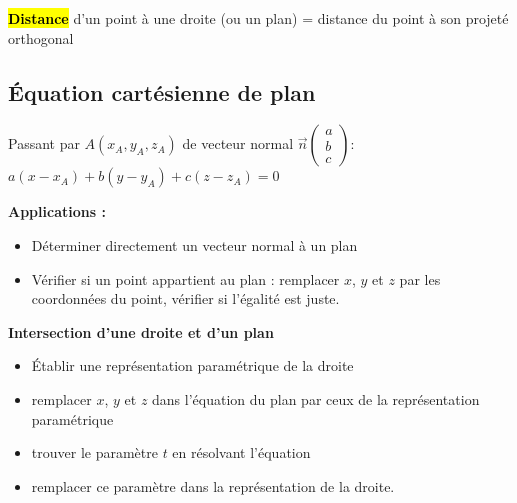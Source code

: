 \documentclass[10pt,fleqn, openany, landscape, twocolumn]{book} %
\begin{document}
\hfill {}


\hl{\textbf{Distance}} d'un point à une droite (ou un plan) = distance du point à son projeté orthogonal

\subsection*{Équation cartésienne de plan}
\vspace{-0.5cm}
Passant par $A(x_A, y_A, z_A)$ de vecteur normal $\vec n \begin{pmatrix}a\\b\\c\end{pmatrix}$: $a(x-x_A)+b(y-y_A)+c(z-z_A)=0$

\textbf{Applications :}
\begin{itemize}
\item Déterminer directement un vecteur normal à un plan
\item Vérifier si un point appartient au plan : remplacer $x$, $y$ et $z$ par les coordonnées du point, vérifier si l'égalité est juste.
\end{itemize}

\textbf{Intersection d'une droite et d'un plan}
\begin{itemize}
\item Établir une représentation paramétrique de la droite
\item remplacer $x$, $y$ et $z$ dans l'équation du plan par ceux de la représentation paramétrique
\item trouver le paramètre $t$ en résolvant l'équation
\item remplacer ce paramètre dans la représentation de la droite.
\end{itemize}
\end{document}
